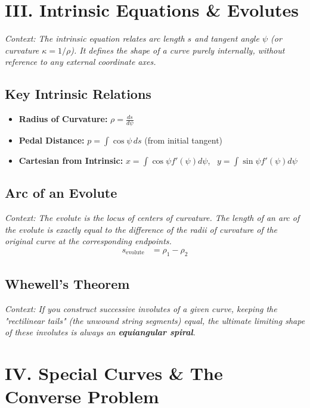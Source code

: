 \documentclass[11pt, a4paper]{article}
\begin{document}
\section*{\color{primary} III. Intrinsic Equations \& Evolutes}

\textit{\small Context: The intrinsic equation relates arc length $s$ and tangent angle $\psi$ (or curvature $\kappa = 1/\rho$). It defines the shape of a curve purely internally, without reference to any external coordinate axes.}

\subsection*{\color{secondary} Key Intrinsic Relations}
\begin{itemize}[leftmargin=*, nosep]
    \item \textbf{\color{accent}Radius of Curvature:} $\rho = \frac{ds}{d\psi}$
    \item \textbf{\color{accent}Pedal Distance:} $p = \int \cos \psi \, ds$ (from initial tangent)
    \item \textbf{\color{accent}Cartesian from Intrinsic:} $x = \int \cos \psi f'(\psi) d\psi$, \ $y = \int \sin \psi f'(\psi) d\psi$
\end{itemize}

\subsection*{\color{secondary} Arc of an Evolute}
\textit{\small Context: The evolute is the locus of centers of curvature. The length of an arc of the evolute is exactly equal to the difference of the radii of curvature of the original curve at the corresponding endpoints.}
\begin{align*}
    s_{\text{evolute}} &= \rho_1 - \rho_2
\end{align*}

\subsection*{\color{secondary} Whewell's Theorem}
\textit{\small Context: If you construct successive involutes of a given curve, keeping the "rectilinear tails" (the unwound string segments) equal, the ultimate limiting shape of these involutes is always an \textbf{equiangular spiral}.}

\section*{\color{primary} IV. Special Curves \& The Converse Problem}
\end{document}
